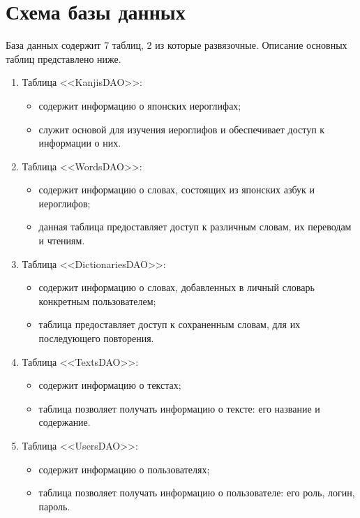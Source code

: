 \clearpage

\section{Схема базы данных}

База данных содержит 7 таблиц, 2 из которые развязочные. Описание основных таблиц представлено ниже.

\begin{enumerate}
    \item Таблица <<KanjisDAO>>:
        \begin{itemize}[label=---]
            \item содержит информацию о японских иероглифах;
            \item служит основой для изучения иероглифов и обеспечивает доступ к информации о них.
        \end{itemize}
    \item Таблица <<WordsDAO>>:
        \begin{itemize}[label=---]
            \item содержит информацию о словах, состоящих из японских азбук и иероглифов;
            \item данная таблица предоставляет доступ к различным словам, их переводам и чтениям.
        \end{itemize}
    \item Таблица <<DictionariesDAO>>:
        \begin{itemize}[label=---]
            \item содержит информацию о словах, добавленных в личный словарь конкретным пользователем;
            \item таблица предоставляет доступ к сохраненным словам, для их последующего повторения.
        \end{itemize}
    \item Таблица <<TextsDAO>>:
        \begin{itemize}[label=---]
            \item содержит информацию о текстах;
            \item таблица позволяет получать информацию о тексте: его название и содержание.
        \end{itemize}
    \item Таблица <<UsersDAO>>:
        \begin{itemize}[label=---]
            \item содержит информацию о пользователях;
            \item таблица позволяет получать информацию о пользователе: его роль, логин, пароль.
        \end{itemize}
\end{enumerate}

